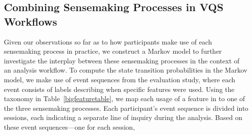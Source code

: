  \subsection{Combining Sensemaking Processes in VQS Workflows}
 Given our observations so far as to how participants make use of each sensemaking process in practice, we construct a Markov model to further investigate the interplay between these sensemaking processes in the context of an analysis workflow.  %
 To compute the state transition probabilities in the Markov model, we make use of event sequences from the evaluation study, where each event consists of labels describing when specific features were used.
 Using the taxonomy in Table~\ref{bigfeaturetable}, we map each usage of a feature in \zvpp to one of the three sensemaking processes. Each participant's event sequence is divided into sessions, each indicating a separate line of inquiry during the analysis. Based on these event sequences---one for each session,
